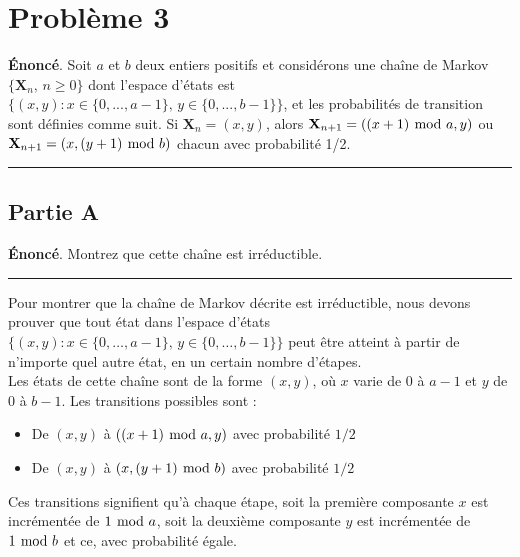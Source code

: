 \documentclass{article}
\begin{document}

\newpage
\section*{Problème 3}
\textbf{Énoncé}. Soit $a$ et $b$ deux entiers positifs et considérons une chaîne de 
Markov $\{\mathbf{X}_n,\,n\ge0\}$ dont l'espace d'états est 
$\{(x,y):x\in\{0,...,a-1\},\,y\in\{0,...,b-1\}\}$, et les probabilités de transition 
sont définies comme suit. Si $\mathbf{X}_n=(x,y)$, alors 
$\mathbf{X}_{n+1}=((x+1)\hspace{-.1cm}\mod{a},y)$ ou 
$\mathbf{X}_{n+1}=(x,(y+1)\hspace{-.1cm}\mod{b})$ chacun avec probabilité 1/2.
\vspace{.6cm}
\hrule
\vspace{.2cm}
\subsection*{Partie A}
\textbf{Énoncé}. Montrez que cette chaîne est irréductible.
\vspace{.2cm}
\hrule
\vspace{.4cm}
Pour montrer que la chaîne de Markov décrite est irréductible, nous devons prouver 
que tout état dans l'espace d'états $\{(x,y):x\in\{0,\dots,a-1\},\,y\in\{0,\dots,b-1\}\}$ 
peut être atteint à partir de n'importe quel autre état, en un certain nombre d'étapes. \\

Les états de cette chaîne sont de la forme $(x, y)$, où $x$ varie de $0$ à $a-1$ et $y$ de $0$ à $b-1$. Les transitions possibles sont :
\begin{itemize}
    \item De $(x, y)$ à $((x+1)\hspace{-.1cm}\mod a, y)$ avec probabilité $1/2$
    \item De $(x, y)$ à $(x, (y+1)\hspace{-.1cm}\mod b)$ avec probabilité $1/2$
\end{itemize}

Ces transitions signifient qu'à chaque étape, soit la première composante $x$ 
est incrémentée de $1\hspace{-.1cm}\mod a$, soit la deuxième composante $y$ est incrémentée 
de $1\hspace{-.1cm}\mod b$ et ce, avec probabilité égale. \\
\end{document}
